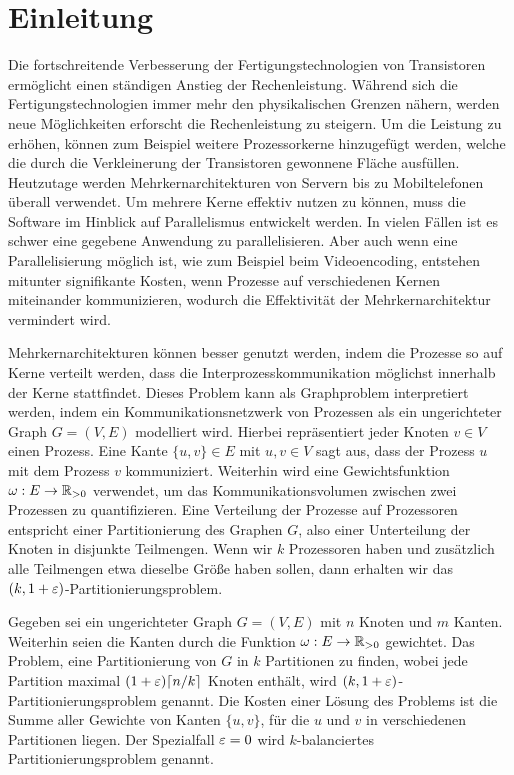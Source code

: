 \chapter{Einleitung}\label{chapter:introduction}
Die fortschreitende Verbesserung der Fertigungstechnologien von Transistoren ermöglicht einen ständigen Anstieg der Rechenleistung.
Während sich die Fertigungstechnologien immer mehr den physikalischen Grenzen nähern, werden neue Möglichkeiten erforscht die Rechenleistung zu steigern.
Um die Leistung zu erhöhen, können zum Beispiel weitere Prozessorkerne hinzugefügt werden, welche die durch die Verkleinerung der Transistoren gewonnene Fläche ausfüllen.
Heutzutage werden Mehrkernarchitekturen von Servern bis zu Mobiltelefonen überall verwendet.
Um mehrere Kerne effektiv nutzen zu können, muss die Software im Hinblick auf Parallelismus entwickelt werden.
In vielen Fällen ist es schwer eine gegebene Anwendung zu parallelisieren.
Aber auch wenn eine Parallelisierung möglich ist, wie zum Beispiel beim Videoencoding, entstehen mitunter signifikante Kosten, wenn Prozesse auf verschiedenen Kernen miteinander kommunizieren, wodurch die Effektivität der Mehrkernarchitektur vermindert wird.~\cite{LTS09}

Mehrkernarchitekturen können besser genutzt werden, indem die Prozesse so auf Kerne verteilt werden, dass die Interprozesskommunikation möglichst innerhalb der Kerne stattfindet.
Dieses Problem kann als Graphproblem interpretiert werden, indem ein Kommunikationsnetzwerk von Prozessen als ein ungerichteter Graph $G = (V, E)$ modelliert wird.
Hierbei repräsentiert jeder Knoten $v \in V$ einen Prozess.
Eine Kante $\{u, v\} \in E$ mit $u, v \in V$ sagt aus, dass der Prozess $u$ mit dem Prozess $v$ kommuniziert.
Weiterhin wird eine Gewichtsfunktion $\omega : E \rightarrow \mathbb{R}_{>0}$ verwendet, um das Kommunikationsvolumen zwischen zwei Prozessen zu quantifizieren.
Eine Verteilung der Prozesse auf Prozessoren entspricht einer Partitionierung des Graphen $G$, also einer Unterteilung der Knoten in disjunkte Teilmengen.
Wenn wir $k$ Prozessoren haben und zusätzlich alle Teilmengen etwa dieselbe Größe haben sollen, dann erhalten wir das $(k, 1 + \varepsilon)$\hyp Partitionierungsproblem.

\begin{defn}
    Gegeben sei ein ungerichteter Graph $G = (V, E)$ mit $n$ Knoten und $m$ Kanten.
    Weiterhin seien die Kanten durch die Funktion $\omega : E \rightarrow \mathbb{R}_{> 0}$ gewichtet.
    Das Problem, eine Partitionierung von $G$ in $k$ Partitionen zu finden, wobei jede Partition maximal $(1 + \varepsilon) \lceil n/k\rceil$ Knoten enthält, wird $(k,1 + \varepsilon)$\hyp Partitionierungsproblem genannt.
    Die Kosten einer Lösung des Problems ist die Summe aller Gewichte von Kanten $\{u, v\}$, für die $u$ und $v$ in verschiedenen Partitionen liegen.
    Der Spezialfall $\varepsilon=0$ wird $k$\hyp balanciertes Partitionierungsproblem genannt.
\end{defn}

